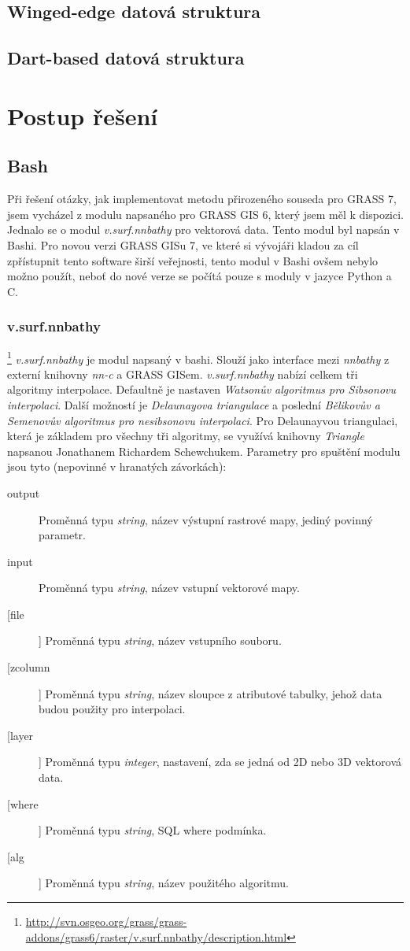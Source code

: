 \documentclass[12pt,a4paper]{article}
\begin{document}
\subsection{Winged-edge datová struktura}
\subsection{Dart-based datová struktura}


\newpage
\section{Postup řešení}
\subsection{Bash}
Při řešení otázky, jak implementovat metodu přirozeného souseda pro GRASS 7, jsem vycházel z modulu napsaného pro GRASS GIS 6, který jsem měl k dispozici. Jednalo se o modul \textit{v.surf.nnbathy} pro vektorová data. Tento modul byl napsán v Bashi. Pro novou verzi GRASS GISu 7, ve které si vývojáři kladou za cíl zpřístupnit tento software širší veřejnosti, tento modul v Bashi ovšem nebylo možno použít, neboť do nové verze se počítá pouze s moduly v jazyce Python a C.

\subsubsection{v.surf.nnbathy}\footnote{\url{http://svn.osgeo.org/grass/grass-addons/grass6/raster/v.surf.nnbathy/description.html}}
\textit{v.surf.nnbathy} je modul napsaný v bashi. Slouží jako interface mezi \textit{nnbathy} z externí knihovny \textit{nn-c} a GRASS GISem. \textit{v.surf.nnbathy} nabízí celkem tři algoritmy interpolace. Defaultně je nastaven \textit{Watsonův algoritmus 	pro Sibsonovu interpolaci}. Další možností je \textit{Delaunayova triangulace} a poslední \textit{Bělikovův a Semenovův algoritmus pro nesibsonovu interpolaci}. Pro Delaunayvou triangulaci, která je základem pro všechny tři algoritmy, se využívá knihovny \textit{Triangle} napsanou Jonathanem Richardem Schewchukem. Parametry pro spuštění modulu jsou tyto (nepovinné v hranatých závorkách):
\begin{description}
\item[output] Proměnná typu \textit{string}, název výstupní rastrové mapy, jediný povinný parametr.
\item[input] Proměnná typu \textit{string}, název vstupní vektorové mapy.
\item[[file]] Proměnná typu \textit{string}, název vstupního souboru.
\item[[zcolumn]] Proměnná typu \textit{string}, název sloupce z atributové tabulky, jehož data budou použity pro interpolaci.
\item[[layer]] Proměnná typu \textit{integer}, nastavení, zda se jedná od 2D nebo 3D vektorová data.
\item[[where]] Proměnná typu \textit{string}, SQL where podmínka.
\item[[alg]] Proměnná typu \textit{string}, název použitého algoritmu.
\end{description}
\end{document}
